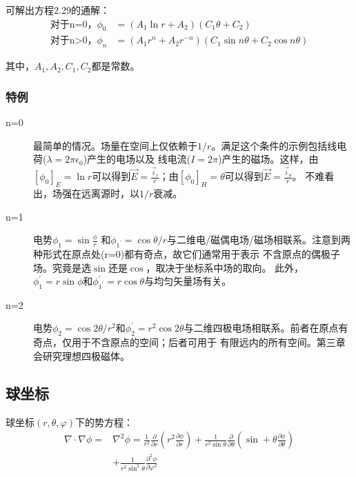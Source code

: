 可解出方程2.29的通解：
\begin{subequations}
	\begin{align}
\mbox{对于n=0，}\phi_{0} &= (A_1 \ln r+A_2)(C_1 \theta+C_2) \\
\mbox{对于n>0，} \phi_{n} &= (A_1 r^n+A_2 r^{-n})(C_1 \sin n\theta +C_2 \cos n\theta)
	\end{align}
\end{subequations}

其中，$A_1, A_2, C_1, C_2$都是常数。

\subsubsection{特例}
\begin{description}
  \item[n=0] 最简单的情况。场量在空间上仅依赖于$1/r$。满足这个条件的示例包括线电荷($\lambda=2\pi \epsilon_0$)产生的电场以及
  线电流($I=2\pi$)产生的磁场。这样，由$[\phi_0]_E=\ln r$可以得到$\vec{E}=\frac{\vec{i}_r}{r} $；由$[\phi_0]_H=\theta$可以得到$\vec{E}=\frac{\vec{i}_{\theta}}{r} $。
  不难看出，场强在远离源时，以$1/r$衰减。
\item[n=1] 电势$\phi_1=\sin \frac{\phi}{r}$ 和$\phi_{1^\prime}=\cos \theta/r$与二维电/磁偶电场/磁场相联系。注意到两种形式在原点处(r=0)都有奇点，故它们通常用于表示
不含原点的偶极子场。究竟是选$\sin$还是$\cos$，取决于坐标系中场的取向。
此外，$\phi_1^\prime=r \sin \phi$和$\phi_{1^\prime}^\prime=r \cos \theta$与均匀矢量场有关。
 \item[n=2] 电势$\phi_2=\cos 2\theta/r^2$和$\phi_2^\prime= r^2 \cos 2\theta$与二维四极电场相联系。前者在原点有奇点，仅用于不含原点的空间；后者可用于
 有限远内的所有空间。第三章会研究理想四极磁体。
\end{description}

\subsection{球坐标}
球坐标$(r, \theta, \varphi)$下的势方程：
\begin{equation}\label{eqn:laplace sph1}
\begin{split}
  \nabla\cdot\nabla\phi=&\nabla^2\phi=\frac{1}{r^2}\frac{\partial}{\partial r}(r^2\frac{\partial \phi}{\partial r})
  +\frac{1}{r^2\sin \theta}\frac{\partial}{\partial \theta}(\sin +\theta\frac{\partial \phi}{\partial \theta})\\
  &+\frac{1}{r^2\sin^2 \theta}\frac{\partial^2 \phi}{\partial \varphi^2}
\end{split}
\end{equation}

